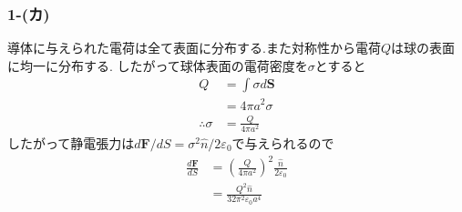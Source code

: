 \subsubsection*{1-(カ)}
導体に与えられた電荷は全て表面に分布する.また対称性から電荷$Q$は球の表面に均一に分布する.
したがって球体表面の電荷密度を$\sigma$とすると
\begin{align*}
  Q                & =\int\sigma d{\bm S} \\
                   & =4\pi a^2\sigma      \\
  \therefore\sigma & =\frac{Q}{4\pi a^2}
\end{align*}
したがって静電張力は$d{\bm F}/dS=\sigma^2\hat{n}/2\varepsilon_0$で与えられるので
\begin{align*}
  \frac{d{\bm F}}{dS} & =\left(\frac{Q}{4\pi a^2}\right)^2\frac{\hat{n}}{2\varepsilon_0} \\
                      & =\frac{Q^2\hat{n}}{32\pi^2\varepsilon_0a^4}
\end{align*}